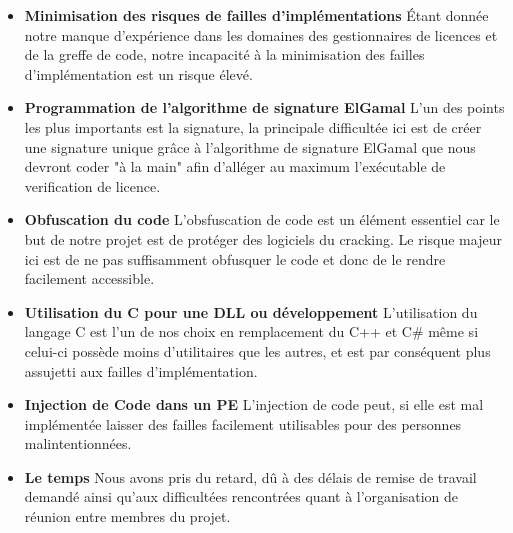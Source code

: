 \begin{itemize}
	\item \textbf{Minimisation des risques de failles d'implémentations} \newline
	Étant donnée notre manque d'expérience dans les domaines des gestionnaires de licences
	et de la greffe de code, notre incapacité à la minimisation des failles d'implémentation est un risque élevé.\newline
	
	\item \textbf{Programmation de l'algorithme de signature ElGamal} \newline
	L'un des points les plus importants est la signature, la principale difficultée ici est de créer une signature unique grâce à l'algorithme de signature ElGamal que nous devront coder "à la main" afin d'alléger au maximum l'exécutable de verification de licence.	\newline
	
	\item \textbf{Obfuscation du code} \newline
	L'obsfuscation de code est un élément essentiel car le but de notre projet est de protéger des logiciels du cracking. Le risque majeur ici est de ne pas suffisamment obfusquer le code et donc de le rendre facilement accessible.\newline
	
	\item \textbf{Utilisation du C pour une DLL ou développement} \newline
	L'utilisation du langage C est l'un de nos choix en remplacement du C++ et C\# même si celui-ci possède moins d'utilitaires que les autres, et est par conséquent plus assujetti aux failles d'implémentation.\newline
	
	\item \textbf{Injection de Code dans un PE} \newline
	L'injection de code peut, si elle est mal implémentée laisser des failles facilement utilisables pour des personnes malintentionnées.\newline
	
	\item \textbf{Le temps} \newline
	Nous avons pris du retard, dû à des délais de remise de travail demandé ainsi qu'aux 
	difficultées rencontrées quant à l'organisation de réunion entre membres du projet.\newline
\end{itemize}


